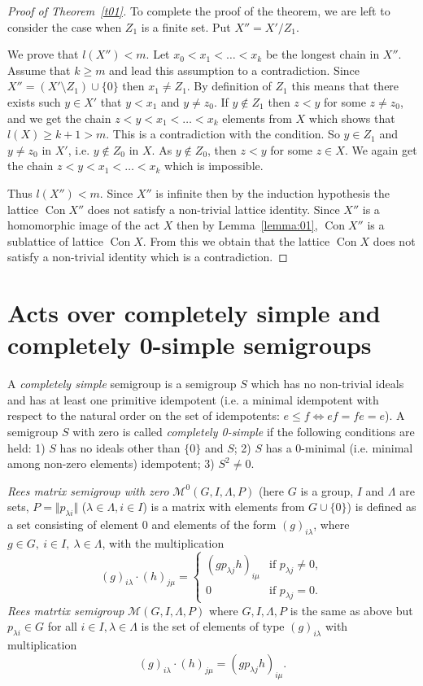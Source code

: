 \documentclass{birkau}
\numberwithin{equation}{section}
\theoremstyle{plain}
\theoremstyle{definition}
\DeclareMathOperator{\Con}{Con}
\begin{document}
\begin{proof}[Proof of Theorem~\ref{t01}]
		To complete the proof of the theorem, we are left to consider the case when $Z_1$ is a finite set. Put $X'' = X'/{Z_1}$.
		
		We prove that $l(X'') < m$. Let $ x_0 < x_1 < \ldots < x_k $ be the longest chain in $X''$. Assume that $k \geqslant m$ and lead this assumption to a contradiction. Since $X'' = (X' \setminus Z_1) \cup \{0\}$ then $ x_1 \neq Z_1$. By definition of $Z_1$ this means that there exists such $y \in X'$ that $y < x_1$ and $y \neq z_0$. If $y \notin Z_1$ then $z < y$ for some $z \neq z_0$, and we get the chain $z < y < x_1 < \ldots < x_k $ elements from $X$ which shows that $l(X) \geqslant k+1 > m$. This is a contradiction with the condition. So $y \in Z_1$ and $y \neq z_0$ in $X'$, i.e. $y \not \in Z_0$ in $X$. As $y \notin Z_0$, then $ z < y$ for some $z \in X$. We again get the chain $ z < y < x_1 < \ldots < x_k $ which is impossible.
		
		Thus $ l(X'') < m$. Since $X''$ is infinite then by the induction hypothesis the lattice $\Con X''$ does not satisfy a non-trivial lattice identity. Since $X''$ is a homomorphic image of the act $X$ then by Lemma~\ref{lemma:01}, $\Con X''$ is a sublattice of lattice $\Con X$. From this we obtain that the lattice $\Con X$ does not satisfy a non-trivial identity which is a contradiction.
	\end{proof}
	
	\section{Acts over completely simple and completely 0-simple semigroups}
	
    A \textit{completely simple} semigroup is a semigroup $S$ which has no non-trivial ideals and has at least one primitive idempotent (i.e. a minimal idempotent with respect to the natural order on the set of idempotents: $e \leqslant f \Leftrightarrow ef=fe=e$). A semigroup $S$ with zero is called \textit{completely 0-simple} if the following conditions are held: 1) $S$ has no ideals other than $\{0\}$ and $S$; 2) $S$ has a 0-minimal (i.e. minimal among non-zero elements) idempotent; 3) $S^2 \neq 0$.
	
	\textit{Rees matrix semigroup with zero} $\mathcal{M}^0(G,I,\Lambda,P)$ (here $G$ is a group, $I$ and $\Lambda$ are sets, $P=\Vert p_{\lambda i} \Vert$ ($\lambda \in \Lambda, i \in I$) is a matrix with elements from $G \cup \{0\}$) is defined as a set consisting of element 0 and elements of the form $(g)_{i\lambda}$, where $g \in G,\ i \in I,\ \lambda \in \Lambda$, with the multiplication
		$$ (g)_{i\lambda} \cdot (h)_{j\mu} =
			\begin{cases}
				(gp_{\lambda j}h)_{i\mu} & \text{if } p_{\lambda j} \neq 0,\\
				0 & \text{if } p_{\lambda j} = 0.
			\end{cases}
		$$
	\textit{Rees matrtix semigroup} $\mathcal{M}(G,I,\Lambda,P)$ where $G,I,\Lambda,P$ is the same as above but $p_{\lambda i} \in G$ for all $i \in I,\lambda \in \Lambda$ is the set of elements of type $(g)_{i\lambda}$ with multiplication $$ (g)_{i\lambda} \cdot (h)_{j\mu} = (gp_{\lambda j}h)_{i\mu}. $$
	
\end{document}
